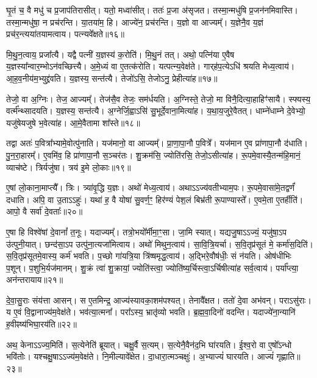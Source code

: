 घृ॒तं च॒ वै मधु॑ च प्र॒जा\-प॑तिरासीत्।
यतो॒ मध्वा॑सीत्।
ततः॑ प्र॒जा अ॑\-सृजत।
तस्मा॒न्मधु॑षि प्र॒जन॑नमिवास्ति।
तस्मा॒न्मधु॑षा॒ न प्रच॑रन्ति।
या॒तया॑म॒ हि।
आज्ये॑न॒ प्रच॑रन्ति।
य॒ज्ञो वा आज्यम्᳚।
य॒ज्ञेनै॒व य॒ज्ञं प्रच॑र॒न्त्यया॑तयामत्वाय।
पत्न्यवे᳚क्षते॥१६॥

मि॒थु॒न॒त्वाय॒ प्रजा᳚त्यै।
यद्वै पत्नी॑ य॒ज्ञस्य॑ क॒रोति॑।
मि॒थु॒नं तत्।
अथो॒ पत्नि॑या ए॒वैष य॒ज्ञस्या᳚न्वार॒म्भो\-ऽन॑वच्छित्त्यै।
अ॒मे॒ध्यं वा ए॒तत्क॑रोति।
यत्पत्न्य॒वेक्ष॑ते।
गार्‌\mbox{}ह॑प॒त्येऽधि॑ श्रयति मेध्य॒त्वाय॑।
आ॒ह॒व॒नीय॑म॒भ्युद्द्र॑वति।
य॒ज्ञस्य॒ सन्त॑त्यै।
तेजो॑ऽसि॒ तेजोऽनु॒ प्रेहीत्या॑ह॥१७॥

तेजो॒ वा अ॒ग्निः।
तेज॒ आज्यम्᳚।
तेज॑सै॒व तेजः॒ सम॑र्धयति।
अ॒ग्निस्ते॒ तेजो॒ मा विनै॒दित्या॒हाहिꣳ॑सायै।
स्फ्यस्य॒ वर्त्म᳚न्थ्सादयति।
य॒ज्ञस्य॒ सन्त॑त्यै।
अ॒ग्नेर्जि॒ह्वाऽसि॑ सु॒भूर्दे॒वाना॒मित्या॑ह।
य॒था॒\-य॒जु\-रे॒वै\-तत्।
धाम्ने॑धाम्ने दे॒वेभ्यो॒ यजु॑षेयजुषे भ॒वेत्या॑ह।
आ॒\-मे॒वैतामा शा᳚स्ते॥१८॥

तद्वा अतः॑ प॒वित्रा᳚भ्यामे॒वोत्पु॑नाति।
यज॑मानो॒ वा आज्यम्᳚।
प्रा॒णा॒पा॒नौ प॒वित्रे᳚।
यज॑मान ए॒व प्रा॑णापा॒नौ द॑धाति।
पु॒न॒रा॒हारम्᳚।
ए॒वमि॑व॒ हि प्रा॑णापा॒नौ स॒ञ्चर॑तः।
शु॒क्रम॑सि॒ ज्योति॑रसि॒ तेजो॒\-ऽसीत्या॑ह।
रू॒पमे॒वास्यै॒तन्म॑हि॒मानं॒ व्याच॑ष्टे।
त्रिर्यजु॑षा।
त्रय॑ इ॒मे लो॒काः॥१९॥

ए॒षां लो॒काना॒माप्त्यै᳚।
त्रिः।
त्र्या॑वृ॒द्धि य॒ज्ञः।
अथो॑ मेध्य॒त्वाय॑।
अथाऽऽज्य॑वतीभ्याम॒पः।
रू॒पमे॒वासा॑मे॒तद्वर्णं॑ दधाति।
अपि॒ वा उ॒ताऽऽहुः॑।
यथा॑ ह॒ वै योषा॑ सु॒वर्ण॒ꣳ॒ हिर॑ण्यं पेश॒लं बिभ्र॑ती रू॒पाण्यास्ते᳚।
ए॒वमे॒ता ए॒तर्\mbox{}हीति॑।
आपो॒ वै सर्वा॑ दे॒वताः᳚॥२०॥

ए॒षा हि विश्वे॑षां दे॒वानां᳚ त॒नूः।
यदाज्यम्᳚।
तत्रो॒भयो᳚र्मीमा॒ꣳ॒सा।
जा॒मि स्यात्।
यद्यजु॒षा\-ऽऽज्यं॒ यजु॑षा॒ऽप उ॑त्पुनी॒यात्।
छन्द॑सा॒ऽप उत्पु॑ना॒त्यजा॑मित्वाय।
अथो॑ मिथुन॒त्वाय॑।
सा॒वि॒त्रि॒यर्चा।
स॒वि॒तृप्र॑सूतं मे॒ कर्मा॑स॒दिति॑।
स॒वि॒तृप्र॑सूतमे॒वास्य॒ कर्म॑ भवति।
प॒च्छो गा॑यत्रि॒या त्रि॑ष्षमृद्ध॒त्वाय॑।
अ॒द्भिरे॒वौष॑धीः॒ सं न॑यति।
ओष॑धीभिः प॒शून्।
प॒शुभि॒र्यज॑मानम्।
शु॒क्रं त्वा॑ शु॒क्रायां॒ ज्योति॑स्त्वा॒ ज्योति॑ष्य॒र्चिस्त्वा॒\-ऽर्चिषीत्या॑ह सर्व॒त्वाय॑।
पर्या᳚प्त्या॒ अन॑न्तरायाय॥२१॥\anuvakamend[ई॒क्ष॒त॒ आ॒ह॒ शा॒स्ते॒ लो॒का दे॒वता॑ भवति॒ षट् च॑]

दे॒वा॒सु॒राः संय॑त्ता आसन्।
स ए॒तमिन्द्र॒ आज्य॑स्याव\-का॒शम॑\-पश्यत्।
तेनावै᳚क्षत।
ततो॑ दे॒वा अभ॑वन्।
पराऽसु॑राः।
य ए॒वं वि॒द्वानाज्य॑म॒वेक्ष॑ते।
भव॑त्या॒त्मना᳚।
परा᳚ऽस्य॒ भ्रातृ॑व्यो भवति।
ब्र॒ह्म॒वा॒दिनो॑ वदन्ति।
यदाज्ये॑ना॒न्यानि॑ ह॒वीꣴष्य॑भिघा॒रय॑ति॥२२॥

अथ॒ केनाऽऽज्य॒मिति॑।
स॒त्येनेति॑ ब्रूयात्।
चक्षु॒र्वै स॒त्यम्।
स॒त्येनै॒वैन॑द॒भि घा॑रयति।
ई॒श्व॒रो वा ए॒षो᳚\-ऽन्धो भवि॑तोः।
यश्चक्षु॒षा\-ऽऽज्य॑म॒वेक्ष॑ते।
नि॒मील्यावे᳚क्षेत।
दा॒धारा॒त्मञ्चक्षुः॑।
अ॒भ्याज्यं॑ घारयति।
आज्यं॑ गृह्णाति॥२३॥

